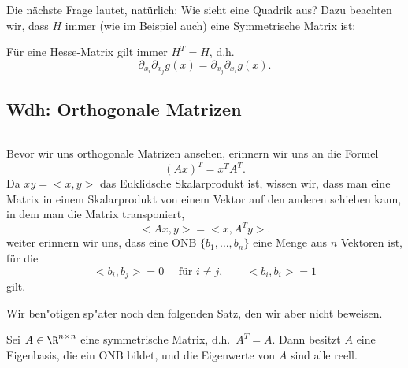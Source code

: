 
Die n\"achste Frage lautet, nat\"urlich: Wie sieht eine Quadrik aus?
Dazu beachten wir, dass $H$ immer (wie im Beispiel auch) eine 
Symmetrische Matrix ist:
\begin{satz} F\"ur eine Hesse-Matrix gilt immer $H^T=H$, d.h.\
$$ \partial_{x_i}\partial_{x_j}g(x) 
= 
\partial_{x_j}\partial_{x_i}g(x).
$$
\end{satz}



\begin{auf}\chc\label{block1A1}

\end{auf}




\subsection{Wdh: Orthogonale Matrizen}$\quad$\par
Bevor wir uns orthogonale Matrizen ansehen, erinnern wir uns an die Formel
$$ (Ax)^T = x^T A^T.$$
Da $x y= <x,y>$ das Euklidsche Skalarprodukt ist, wissen wir, dass
man eine Matrix in einem Skalarprodukt von einem Vektor auf den anderen
schieben kann, in dem man die Matrix transponiert,
$$< Ax,y> = <x, A^Ty>.$$
weiter erinnern wir uns, dass eine ONB $\{b_1,\ldots, b_n\}$ 
eine Menge aus $n$ Vektoren ist, f\"ur die 
$$ <b_i,b_j>=0\quad\mbox{ f\"ur } i\not = j, \qquad <b_i,b_i>=1$$
gilt.

Wir ben"otigen sp"ater noch den folgenden Satz, den wir aber nicht beweisen.
\begin{satz}\label{symmEV}
Sei $A\in\R^{n\times n}$ eine symmetrische Matrix, d.h.\ $A^T=A$. Dann besitzt
$A$ eine Eigenbasis, die ein ONB bildet, und die Eigenwerte von $A$ sind alle reell.
\end{satz}


